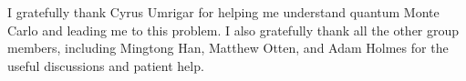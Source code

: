 \documentclass[%
reprint,
nofootinbib,
amsmath,amssymb,
aps,
prl,
]{revtex4-1}
\begin{document}

%



\begin{acknowledgments}
I gratefully thank Cyrus Umrigar for helping me understand quantum Monte Carlo and leading me to this problem.
I also gratefully thank all the other group members, including Mingtong Han, Matthew Otten, and Adam Holmes for the useful discussions and patient help.
\end{acknowledgments}

\nocite{*}

\end{document}
